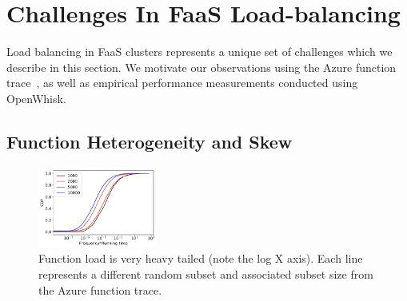 
\section{Challenges In FaaS Load-balancing}
\label{sec:challenges}
Load balancing in FaaS clusters represents a unique set of challenges which we describe in this section.
We motivate our observations using the Azure function trace~\cite{shahrad_serverless_2020}, as well as empirical performance measurements conducted using OpenWhisk.  



\subsection{Function Heterogeneity and Skew}


\begin{figure}
  \includegraphics[width=0.35\textwidth]{../figs/freqs-all.pdf}
  \caption{Function load is very heavy tailed (note the log X axis). Each line represents a different random subset and associated subset size from the Azure function trace. }
  \label{fig:freqs}
\end{figure}

